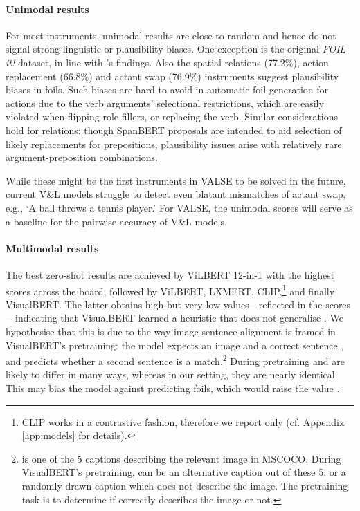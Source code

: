 \documentclass[11pt]{article}
\newcommand{\dataset}{VALSE}
\begin{document}
\paragraph{Unimodal results} For most instruments, unimodal results are close to random and hence do not signal strong linguistic or plausibility biases.
One exception is the original \textit{FOIL it!} dataset, in line with \citet{madhyastha-etal-2019-vifidel}'s findings.
Also the spatial relations (77.2\%), action replacement (66.8\%) and actant swap (76.9\%) instruments 
suggest plausibility biases in 
foils. Such biases are hard to avoid in automatic foil generation for actions due to the verb arguments' selectional restrictions, which are easily  violated when flipping role fillers, or replacing
the verb. 
Similar considerations hold for relations: though SpanBERT proposals are intended to aid selection of likely replacements for prepositions, plausibility issues arise with relatively rare argument-preposition combinations.

While these might be the first instruments in \dataset{} to be solved in the future, current V\&L models struggle to detect even blatant mismatches of actant swap, e.g., `A ball throws a tennis player.'
For \dataset{}, the unimodal scores will serve as a baseline for the pairwise accuracy of V\&L models.

\paragraph{Multimodal results} The best zero-shot results are achieved by ViLBERT 12-in-1 with the highest scores across the board, followed by ViLBERT, LXMERT, CLIP,\footnote{CLIP works in a contrastive fashion, therefore we report only  (cf. Appendix \ref{app:models} for details).} and finally VisualBERT. The latter obtains high  but very low  values---reflected in the  scores---indicating that VisualBERT learned a heuristic that does not generalise
\cite[see][for similar observations with other models]{Hendricks2021}. We hypothesise that this is due to the way image-sentence alignment is framed in VisualBERT's pretraining: the model expects an image and a correct sentence , and predicts whether a second sentence  is a match.\footnote{ is one of the 5 captions describing the relevant image in MSCOCO. During VisualBERT's pretraining,  can be an alternative caption out of these 5, or a randomly drawn caption which does not describe the image. The pretraining task is to determine if  correctly describes the image or not.}
During pretraining  and  are likely to differ in 
many ways, whereas in our setting, they are nearly identical.
This may bias the model against predicting foils, which would raise the value .
\end{document}
